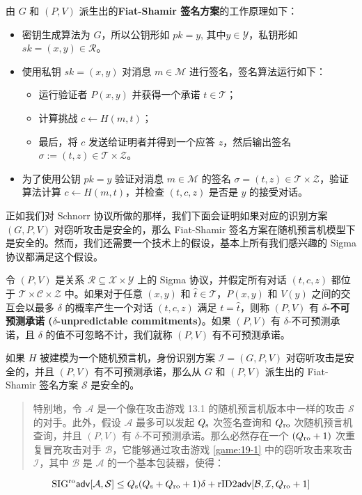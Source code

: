 由 $G$ 和 $(P, V)$ 派生出的\textbf{Fiat-Shamir 签名方案}的工作原理如下：
\begin{itemize}
	\item 密钥生成算法为 $G$，所以公钥形如 $pk=y$, 其中$y\in\mathcal{Y}$，私钥形如 $sk=(x,y)\in\mathcal{R}$。
	\item 使用私钥 $sk = (x, y)$ 对消息 $m\in\mathcal{M}$ 进行签名，签名算法运行如下：
	\begin{itemize}
		\item 运行验证者 $P(x,y)$ 并获得一个承诺 $t\in\mathcal{T}$；
		\item 计算挑战 $c\leftarrow H(m,t)$；
		\item 最后，将 $c$ 发送给证明者并得到一个应答 $z$，然后输出签名 $\sigma:=(t,z)\in\mathcal{T}\times\mathcal{Z}$。
	\end{itemize}
	\item 为了使用公钥 $pk=y$ 验证对消息 $m\in\mathcal{M}$ 的签名 $\sigma=(t,z)\in\mathcal{T}\times\mathcal{Z}$，验证算法计算 $c\leftarrow H(m,t)$，并检查 $(t,c,z)$ 是否是 $y$ 的接受对话。
\end{itemize}

正如我们对 Schnorr 协议所做的那样，我们下面会证明如果对应的识别方案 $(G,P,V)$ 对窃听攻击是安全的，那么 Fiat-Shamir 签名方案在随机预言机模型下是安全的。然而，我们还需要一个技术上的假设，基本上所有我们感兴趣的 Sigma 协议都满足这个假设。

\begin{definition}[不可预测承诺]\label{def:19-7}
令 $(P,V)$ 是关系 $\mathcal{R}\subseteq\mathcal{X}×\mathcal{Y}$ 上的 Sigma 协议，并假定所有对话 $(t,c,z)$ 都位于 $\mathcal{T}\times\mathcal{C}\times\mathcal{Z}$ 中。如果对于任意 $(x,y)$ 和 $\hat t\in\mathcal{T}$，$P(x,y)$ 和 $V(y)$ 之间的交互会以最多 $\delta$ 的概率产生一个对话 $(t,c,z)$ 满足 $t=\hat t$，则称 $(P,V)$ 有 \textbf{$\delta$-不可预测承诺 ($\delta$-unpredictable commitments)}。如果 $(P,V)$ 有 $\delta$-不可预测承诺，且 $\delta$ 的值不可忽略不计，我们就称 $(P,V)$ 有不可预测承诺。
\end{definition}

\begin{theorem}\label{theo:19-16}
如果 $H$ 被建模为一个随机预言机，身份识别方案 $\mathcal{I}=(G,P,V)$ 对窃听攻击是安全的，并且 $(P,V)$ 有不可预测承诺，那么从 $G$ 和 $(P, V)$ 派生出的 Fiat-Shamir 签名方案 $\mathcal{S}$ 是安全的。
\begin{quote}
	特别地，令 $\mathcal{A}$ 是一个像在攻击游戏 13.1 的随机预言机版本中一样的攻击 $\mathcal{S}$ 的对手。此外，假设 $\mathcal{A}$ 最多可以发起 $Q_{\rm s}$ 次签名查询和 $Q_{\rm ro}$ 次随机预言机查询，并且 $(P, V)$ 有 $\delta$-不可预测承诺。那么必然存在一个 $(Q_{\rm ro}+1)$ 次重复冒充攻击对手 $\mathcal{B}$，它能够通过攻击游戏 \ref{game:19-1} 中的窃听攻击来攻击 $\mathcal{I}$，其中 $\mathcal{B}$ 是 $\mathcal{A}$ 的一个基本包装器，使得：
\end{quote}
\[
{\rm SIG^{ro}\mathsf{adv}}[\mathcal{A},\mathcal{S}]\leq Q_{\rm s}(Q_{\rm s}+Q_{\rm ro}+1)\delta+{\rm rID2\mathsf{adv}}[\mathcal{B},\mathcal{I},Q_{\rm ro}+1]
\]
\end{theorem}

